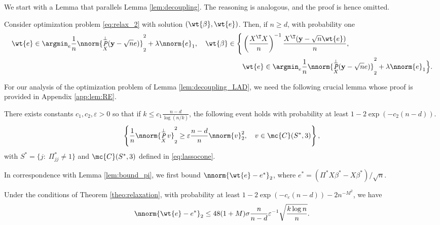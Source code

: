 \documentclass[11pt]{article}
\DeclareMathOperator{\pre}{\emph{\texttt{P}}}
\def\y{\mathbf{y}}
\def\epss{\varepsilon}
\begin{document}
We start with a Lemma that parallels Lemma \ref{lem:decoupling}. The reasoning is analogous, and the proof is hence omitted.   
\begin{lemma}\label{lem:decoupling_LAD} 
Consider optimization problem \eqref{eq:relax_2} with solution $(\wt{\beta}, \wt{e})$. Then, if $n \geq d$, with probability one
\begin{align*}
  \wt{e} \in \argmin_{e} \frac{1}{n} \nnorm{\pre_X^{\perp} (\y - \sqrt{n}  e)}_2^2 + \lambda \nnorm{e}_1, \quad
  \wt{\beta} \in \Bigg\{ &\left(\frac{X^{\T} X}{n} \right)^{-1} \frac{X^{\T} (\y - \sqrt{n} \wt{e})}{n}, \\
  &\wt{e} \in \argmin_{e} \frac{1}{n} \nnorm{\pre_X^{\perp} (\y - \sqrt{n} e)}_2^2 + \lambda \nnorm{e}_1 \Big \}.
\end{align*}
\end{lemma}
\noindent For our analysis of the optimization problem of Lemma \ref{lem:decoupling_LAD}, we need the following
crucial lemma whose proof is provided in Appendix \ref{app:lem:RE}.  
\begin{lemma}\label{lem:RE} There exists constants $c_1, c_2, \epss > 0$ so that
  if $k \leq c_1 \frac{n-d}{\log(n/k)}$, the following event holds with probability at least $1 - 2 \exp(-c_2 (n-d) )$. 
\begin{equation*}
  \left\{ \frac{1}{n} \nnorm{\pre_X^{\perp} v}_2^2 \geq \epss \frac{n-d}{n} \nnorm{v}_2^2, \quad v \in \mc{C}(S^*, 3)
  \right \},
\end{equation*}
with $S^* = \{j:\;\Pi_{jj}^* \neq 1 \}$ and $\mc{C}(S^*, 3)$ defined in \eqref{eq:lassocone}. 
\end{lemma}
\noindent In correspondence with Lemma \ref{lem:bound_pi}, we first bound $\nnorm{\wt{e} - e^*}_2$,
where $e^* = (\Pi^* X \beta^* - X \beta^*)/\sqrt{n}$.
\begin{lemma}\label{lem:bound_e} Under the conditions of Theorem \ref{theo:relaxation}, with probability at least $1 - 2 \exp(-c_{\epss} (n-d))  - 2n^{-M^2}$, we have 
\begin{equation*}
\nnorm{\wt{e} - e^*}_2 \leq   48 (1 + M) \sigma  \frac{n}{n-d} \epss^{-1} \sqrt{\frac{k \log n}{n}}.  
\end{equation*}
\end{lemma}
\end{document}
